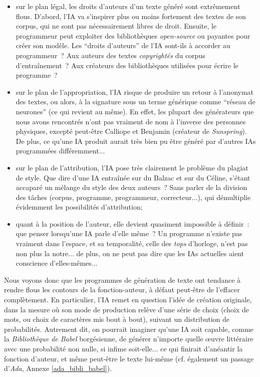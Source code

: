 \documentclass{article}
\begin{document}
					\begin{itemize}
						\item sur le plan légal, les droits d'auteurs d'un texte généré sont extrêmement flous. D'abord, l'IA va s'inspirer plus ou moins fortement des textes de son corpus, qui ne sont pas nécessairement libres de droit. Ensuite, le programmeur peut exploiter des bibliothèques \textit{open-source} ou payantes pour créer son modèle. Les ``droits d'auteurs'' de l'IA sont-ils à accorder au programmeur~? Aux auteurs des textes \textit{copyrightés} du corpus d'entraînement~? Aux créateurs des bibliothèques utilisées pour écrire le programme~?
						\item sur le plan de l'appropriation, l'IA risque de produire un retour à l'anonymat des textes, ou alors, à la signature sous un terme générique comme ``réseau de neurones'' (ce qui revient au même). En effet, les plupart des générateurs que nous avons rencontrés n'ont pas vraiment de nom à l'inverse des personnes physiques, excepté peut-être Calliope et Benjamin (créateur de \textit{Sunspring}). De plus, ce qu'une IA produit aurait très bien pu être généré par d'autres IAs programmées différemment...
						\item sur le plan de l'attribution, l'IA pose très clairement le problème du plagiat de style. Que dire d'une IA entraînée sur du Balzac et sur du Céline, s'étant accaparé un mélange du style des deux auteurs~? Sans parler de la division des tâches (corpus, programme, programmeur, correcteur...), qui démultiplie évidemment les possibilités d'attribution;
						\item quant à la position de l'auteur, elle devient quasiment impossible à définir~: que penser lorsqu'une IA parle d'elle même~? Un programme n'existe pas vraiment dans l'espace, et sa temporalité, celle des \textit{tops} d'horloge, n'est pas non plus la notre... de plus, on ne peut pas dire que les IAs actuelles aient conscience d'elles-mêmes...
					\end{itemize}
					\vspace{2mm}
					Nous voyons donc que les programmes de génération de texte ont tendance à rendre flous les contours de la fonction-auteur, à défaut peut-être de l'effacer complètement. En particulier, l'IA remet en question l'idée de création originale, dans la mesure où son mode de production relève d'une série de choix (choix de mots, ou choix de caractères mis bout à bout), suivant un distribution de probabilités. Autrement dit, on pourrait imaginer qu'une IA soit capable, comme la \textit{Bibliothèque de Babel} borgésienne, de générer n'importe quelle œuvre littéraire avec une probabilité non nulle, si infime soit-elle... ce qui finirait d'anéantir la fonction d'auteur, et même peut-être le texte lui-même (cf. également un passage d'\textit{Ada}, Annexe \ref{ada_bibli_babel}).
\end{document}
